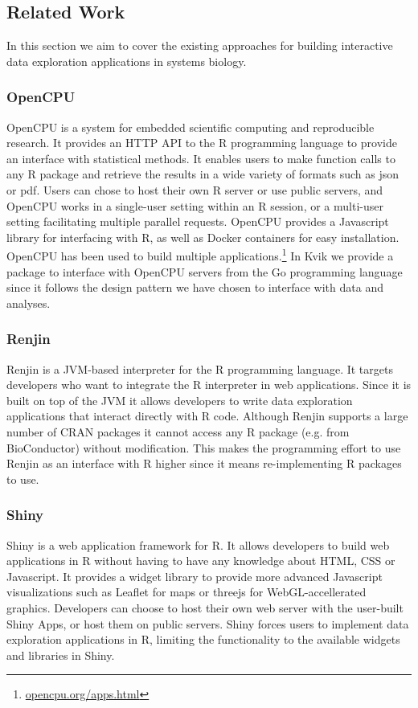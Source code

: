 \subsection*{Related Work} 
In this section we aim to cover the existing approaches for building interactive
data exploration applications in systems biology. 


\subsubsection*{OpenCPU} 
OpenCPU is a system for embedded scientific computing and reproducible
research.\cite{opencpu} It provides an HTTP API to the R programming language to
provide an interface with statistical methods. It enables users to make function
calls to any R package and retrieve the results in a wide variety of formats
such as json or pdf. 
Users can chose to host their own R server or use public servers, and OpenCPU
works in a single-user setting within an R session, or a multi-user setting
facilitating multiple parallel requests. 
OpenCPU provides a Javascript library for interfacing with R, as well as Docker
containers for easy installation. OpenCPU has been used to build multiple
applications.\footnote{\url{opencpu.org/apps.html}} In Kvik we provide a package
to interface with OpenCPU servers from the Go programming language since it
follows the design pattern we have chosen to interface with data and analyses. 


\subsubsection*{Renjin} 
Renjin is a JVM-based interpreter for the R programming language.\cite{renjin}
It targets developers who want to integrate the R interpreter in web
applications. Since it is built on top of the JVM it allows developers to write
data exploration applications that interact directly with R code. Although
Renjin supports a large number of CRAN packages it cannot access any R package
(e.g. from BioConductor) without modification. This makes the programming effort
to use Renjin as an interface with R higher since it means re-implementing R
packages to use. 

\subsubsection*{Shiny} 
Shiny is a web application framework for R.\cite{shiny} It allows developers to
build web applications in R without having to have any knowledge about HTML, CSS
or Javascript. It provides a widget library to provide more advanced Javascript
visualizations such as Leaflet for maps or threejs for WebGL-accellerated
graphics. Developers can choose to host their own web server with the user-built
Shiny Apps, or host them on public servers. Shiny forces users to implement data
exploration applications in R, limiting the functionality to the available
widgets and libraries in Shiny. 


